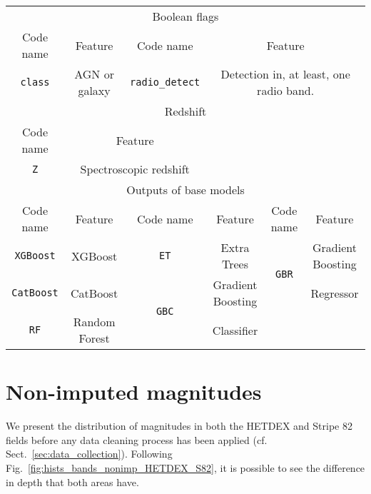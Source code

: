 \documentclass{aa}
\begin{document}
\begin{appendix}
\begin{table}
{\begin{tabular}{c c c c c c}
\hline\hline                 %
\multicolumn{6}{c}{Boolean flags} \\
Code name       & Feature       & Code name                 & \multicolumn{3}{c}{Feature}                                   \\
\hline
\texttt{class}  & AGN or galaxy & \texttt{radio\_detect}    & \multicolumn{3}{c}{Detection in, at least, one radio band.}   \\[0.25em]
\hline\hline                 %
\multicolumn{6}{c}{Redshift} \\
Code name   & \multicolumn{2}{c}{Feature}                   &   &   &   \\
\hline
\texttt{Z}  & \multicolumn{2}{c}{Spectroscopic redshift}    &   &   &   \\[0.25em]
\hline\hline                 %
\multicolumn{6}{c}{Outputs of base models} \\
Code name           & Feature       & Code name                     & Feature           & Code name                     & Feature           \\
\hline
\texttt{XGBoost}    & XGBoost       & \texttt{ET}                   & Extra Trees       & \multirow{2}{*}{\texttt{GBR}} & Gradient Boosting \\
\texttt{CatBoost}   & CatBoost      & \multirow{2}{*}{\texttt{GBC}} & Gradient Boosting &                               & Regressor         \\
\texttt{RF}         & Random Forest &                               & Classifier        &                               &                   \\
\hline                                   %
\end{tabular}
}
\end{table}


\section{Non-imputed magnitudes}\label{sec:app_nonimputed_mag_dist}

We present the distribution of magnitudes in both the HETDEX and Stripe 82 fields before any data cleaning process has been applied (cf. Sect.~\ref{sec:data_collection}). Following Fig.~\ref{fig:hists_bands_nonimp_HETDEX_S82}, it is possible to see the difference in depth that both areas have.


\end{appendix}
\end{document}
